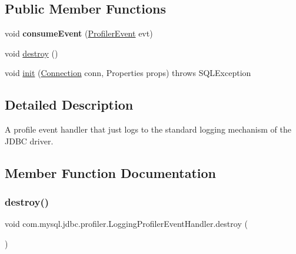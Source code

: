\subsection*{Public Member Functions}
\begin{DoxyCompactItemize}
\item 
\mbox{\label{classcom_1_1mysql_1_1jdbc_1_1profiler_1_1_logging_profiler_event_handler_a3ac48bdd0688a9aa2b6e8f58b1b283cf}} 
void {\bfseries consume\+Event} (\mbox{\hyperlink{classcom_1_1mysql_1_1jdbc_1_1profiler_1_1_profiler_event}{Profiler\+Event}} evt)
\item 
void \mbox{\hyperlink{classcom_1_1mysql_1_1jdbc_1_1profiler_1_1_logging_profiler_event_handler_a9f1d02071f12bd8d00621a7a371a0e2e}{destroy}} ()
\item 
void \mbox{\hyperlink{classcom_1_1mysql_1_1jdbc_1_1profiler_1_1_logging_profiler_event_handler_a2754871ca8890f78c4997b33ae32d925}{init}} (\mbox{\hyperlink{interfacecom_1_1mysql_1_1jdbc_1_1_connection}{Connection}} conn, Properties props)  throws S\+Q\+L\+Exception 
\end{DoxyCompactItemize}


\subsection{Detailed Description}
A profile event handler that just logs to the standard logging mechanism of the J\+D\+BC driver. 

\subsection{Member Function Documentation}
\mbox{\label{classcom_1_1mysql_1_1jdbc_1_1profiler_1_1_logging_profiler_event_handler_a9f1d02071f12bd8d00621a7a371a0e2e}} 
\subsubsection{\texorpdfstring{destroy()}{destroy()}}
{\footnotesize\ttfamily void com.\+mysql.\+jdbc.\+profiler.\+Logging\+Profiler\+Event\+Handler.\+destroy (\begin{DoxyParamCaption}{ }\end{DoxyParamCaption})}

